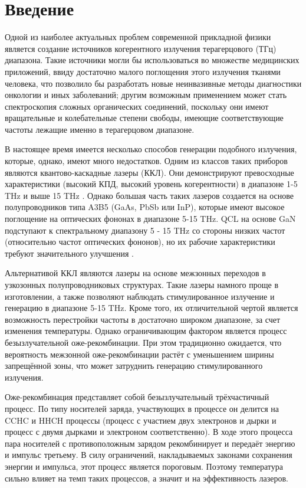 \documentclass[../main.tex]{subfiles}
\begin{document}
\chapter{Введение}

Одной из наиболее актуальных проблем современной прикладной физики является
создание источников когерентного излучения терагерцового (ТГц) диапазона. Такие
источники могли бы использоваться во множестве медицинских приложений, ввиду достаточно 
малого поглощения этого излучения тканями человека, что позволило бы разработать 
новые неинвазивные методы диагностики онкологии и иных заболеваний; другим возможным 
применением может стать спектроскопия сложных органических соединений, поскольку 
они имеют вращательные и колебательные степени свободы, имеющие соответствующие частоты 
лежащие именно в терагерцовом диапазоне.

В настоящее время имеется несколько способов генерации подобного излучения, которые, однако, 
имеют много недостатков. Одним из классов таких приборов являются квантово-каскадные лазеры (ККЛ).
Они демонстрируют превосходные характеристики (высокий КПД, высокий уровень когерентности)
в диапазоне 1-5 THz и выше 15 THz \cite{Intro1}. Однако большая часть таких лазеров создается на основе 
полупроводников типа A3B5 (GaAs, PbSb или InP), которые имеют высокое поглощение на оптических 
фононах в диапазоне 5-15 THz. QCL на основе GaN подступают к спектральному диапазону 5 - 15 THz со
стороны низких частот (относительно частот оптических фононов), но их рабочие характеристики 
требуют значительного улучшения \cite{Intro7}.

Альтернативой ККЛ являются лазеры на основе межзонных переходов в узкозонных полупроводниковых структурах.
Такие лазеры намного проще в изготовлении, а также позволяют наблюдать стимулированное излучение и генерацию
в диапазоне 5-15 THz. Кроме того, их 
отличительной чертой является возможность перестройки частоты в достаточно широком диапазоне, за счет 
изменения температуры. Однако ограничивающим
фактором является процесс безызлучательной оже-рекомбинации. При этом традиционно ожидается, что вероятность 
межзонной оже-рекомбинации растёт с уменьшением ширины запрещённой зоны, что может затруднить генерацию
стимулированного излучения.

Оже-рекомбинация представляет собой безызлучательный трёхчастичный процесс. По типу носителей заряда, участвующих
в процессе он делится на CCHC и HHCH процессы (процесс с участием двух электронов и дырки и процесс с двумя дырками
и электроном соответственно). В ходе этого процесса пара носителей с противоположным зарядом рекомбинирует и
передаёт энергию и импульс третьему. В силу ограничений, накладываемых законами сохранения энергии и импульса,
 этот процесс является пороговым.
Поэтому температура сильно влияет на темп таких процессов, а значит и на эффективность лазеров.
\end{document}
